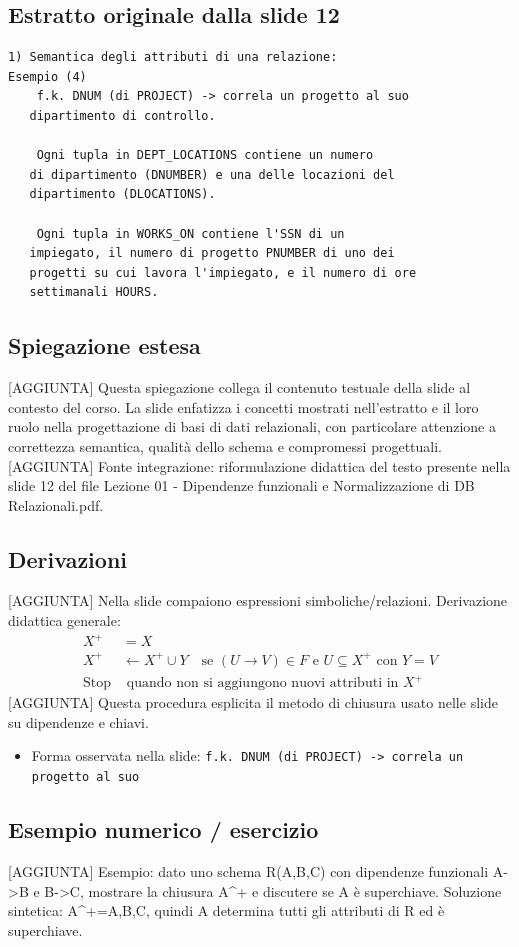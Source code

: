 \documentclass[11pt]{article}
\begin{document}
\subsection*{Estratto originale dalla slide 12}
\begin{lstlisting}
1) Semantica degli attributi di una relazione:
Esempio (4)
    f.k. DNUM (di PROJECT) -> correla un progetto al suo
   dipartimento di controllo.

    Ogni tupla in DEPT_LOCATIONS contiene un numero
   di dipartimento (DNUMBER) e una delle locazioni del
   dipartimento (DLOCATIONS).

    Ogni tupla in WORKS_ON contiene l'SSN di un
   impiegato, il numero di progetto PNUMBER di uno dei
   progetti su cui lavora l'impiegato, e il numero di ore
   settimanali HOURS.
\end{lstlisting}
\subsection*{Spiegazione estesa}
[AGGIUNTA] Questa spiegazione collega il contenuto testuale della slide al contesto del corso. La slide enfatizza i concetti mostrati nell'estratto e il loro ruolo nella progettazione di basi di dati relazionali, con particolare attenzione a correttezza semantica, qualità dello schema e compromessi progettuali.
[AGGIUNTA] Fonte integrazione: riformulazione didattica del testo presente nella slide 12 del file Lezione 01 - Dipendenze funzionali e Normalizzazione di DB Relazionali.pdf.
\subsection*{Derivazioni}
[AGGIUNTA] Nella slide compaiono espressioni simboliche/relazioni. Derivazione didattica generale:
\begin{align*}
X^+ &= X \\
X^+ &\leftarrow X^+ \cup Y \quad \text{se } (U \to V) \in F \text{ e } U \subseteq X^+ \text{ con } Y=V \\
\text{Stop} &\text{ quando non si aggiungono nuovi attributi in } X^+
\end{align*}
[AGGIUNTA] Questa procedura esplicita il metodo di chiusura usato nelle slide su dipendenze e chiavi.
\begin{itemize}[leftmargin=*]
\item Forma osservata nella slide: \texttt{f.k. DNUM (di PROJECT) -> correla un progetto al suo}
\end{itemize}
\subsection*{Esempio numerico / esercizio}
[AGGIUNTA] Esempio: dato uno schema R(A,B,C) con dipendenze funzionali A->B e B->C, mostrare la chiusura A^+ e discutere se A è superchiave. Soluzione sintetica: A^+={A,B,C}, quindi A determina tutti gli attributi di R ed è superchiave.
\end{document}
